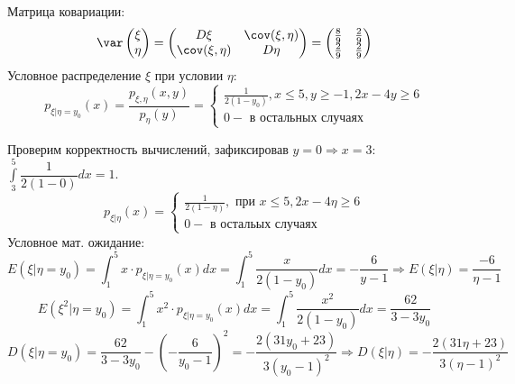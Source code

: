 Матрица ковариации:
\[ \var \begin{pmatrix} \xi \\ \eta \end{pmatrix} = \begin{pmatrix} D\xi & \cov (\xi, \eta) \\ \cov (\xi, \eta) & D\eta \end{pmatrix} = \begin{pmatrix} \frac{8}{9} & \frac{2}{9} \\ \frac{2}{9} & \frac{2}{9} \end{pmatrix} \]
Условное распределение $\xi$ при условии $\eta$:
\[
p_{\xi|\eta = y_0} (x) = \frac{p_{\xi, \eta}  (x,y)}{p_{\eta} (y)} =
\begin{cases}
	\frac{1}{2(1-y_0)}, x \le 5, y \ge -1, 2x - 4y \ge 6 \\
	0 - \text{ в остальных случаях}
\end{cases}
\]
\begin{center}
	\qquad
\end{center}
Проверим корректность вычислений, зафиксировав $y=0 \Rightarrow x = 3$: $\int\limits_{3}^{5} \dfrac{1}{2(1-0)}dx = 1$.
\[
p_{\xi | \eta} (x) =
\begin{cases}
	\frac{1}{2(1-\eta)}, \text{ при } x \le 5, 2x - 4 \eta \ge 6 \\
	0 - \text{ в остальых случаях}
\end{cases}
\]
Условное мат. ожидание:
\[ E(\xi | \eta = y_0) = \int_{1}^{5} x \cdot p_{\xi | \eta = y_0} (x) dx = \int_{1}^{5} \frac{x}{2(1-y_0)} dx = -\frac{6}{y-1} \Rightarrow E(\xi|\eta) = \frac{-6}{\eta-1} \]
\[ E(\xi^2 | \eta = y_0) = \int_{1}^{5} x^2 \cdot p_{\xi | \eta = y_0} (x) dx = \int_{1}^{5} \frac{x^2}{2(1-y_0)} dx = \frac{62}{3-3y_0} \]
\[ D(\xi | \eta = y_0) = \frac{62}{3-3y_0} - \left( -\frac{6}{y_0-1} \right)^2 = -\frac{2(31y_0 + 23)}{3(y_0-1)^2} \Rightarrow D(\xi | \eta) = -\frac{2(31\eta + 23)}{3(\eta-1)^2} \]
	

